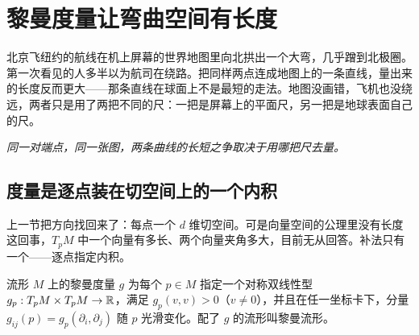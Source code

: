 \section{黎曼度量让弯曲空间有长度}
\label{sec:12-Real-Analysis-Support/08-Manifold-Basics/03}

北京飞纽约的航线在机上屏幕的世界地图里向北拱出一个大弯，几乎蹭到北极圈。第一次看见的人多半以为航司在绕路。把同样两点连成地图上的一条直线，量出来的长度反而更大——那条直线在球面上不是最短的走法。地图没画错，飞机也没绕远，两者只是用了两把不同的尺：一把是屏幕上的平面尺，另一把是地球表面自己的尺。

\begin{center}
\end{center}

\emph{同一对端点，同一张图，两条曲线的长短之争取决于用哪把尺去量。}

\subsection{度量是逐点装在切空间上的一个内积}

上一节把方向找回来了：每点一个 \(d\) 维切空间。可是向量空间的公理里没有长度这回事，\(T_{p}M\) 中一个向量有多长、两个向量夹角多大，目前无从回答。补法只有一个——逐点指定内积。

\begin{definition}[黎曼度量]
流形 \(M\) 上的黎曼度量 \(g\) 为每个 \(p\in M\) 指定一个对称双线性型 \(g_{p}:T_{p}M\times T_{p}M\to\mathbb{R}\)，满足 \(g_{p}(v,v)>0\)（\(v\neq0\)），并且在任一坐标卡下，分量 \(g_{ij}(p)=g_{p}(\partial_{i},\partial_{j})\) 随 \(p\) 光滑变化。配了 \(g\) 的流形叫黎曼流形。
\end{definition}

